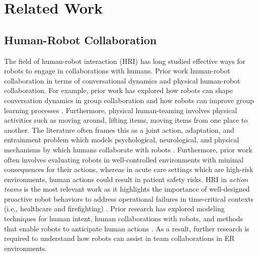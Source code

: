 

\section{Related Work}

\subsection{Human-Robot Collaboration} 

The field of human-robot interaction (HRI) has long studied effective ways for robots to engage in collaborations with humans. 
Prior work human-robot collaboration in terms of conversational dynamics and physical human-robot collaboration.%
For example, prior work has explored how robots can shape conversation dynamics in group collaboration \cite{tennent2019micbot} and how robots can improve group learning processes \cite{alves2019empathic}. 
Furthermore, physical human-teaming involves physical activities such as moving around, lifting items, moving items from one place to another. 
The literature often frames this as a joint action, adaptation, and entrainment problem which models psychological, neurological, and physical mechanisms by which humans collaborate with robots \cite{fourie2022joint,iqbal2016movement,iqbal2017coordination}. 
Furthermore, prior work often involves evaluating robots in well-controlled environments with minimal consequences for their actions, whereas in acute care settings which are high-risk environments, human actions could result in patient safety risks. 
HRI in \textit{action teams} is the most relevant work as it highlights the importance of well-designed proactive robot behaviors to address operational failures in time-critical contexts (i.e., healthcare and firefighting) \cite{jamshad2024taking}. 
Prior research has explored modeling techniques for human intent, human collaborations with robots, and methods that enable robots to anticipate human actions \cite{levine2014concurrent,nikolaidis2013human,dominey2008anticipation,hoffman2007effects}.
As a result, further research is required to understand how robots can assist in team collaborations in ER environments.


